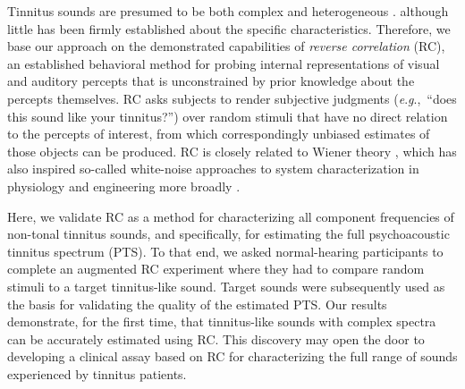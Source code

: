 \documentclass[journal]{IEEEtran}
\newcommand{\eg}{\textit{e}.\textit{g}.,\ }
\begin{document}
Tinnitus sounds are presumed to be both complex and heterogeneous
\cite{vajsakovicPrinciplesMethodsPsychoacoustic2021,henryTinnitusEpidemiologicPerspective2020,meikleTinnitusArchiveArchive2004}.
although little has been firmly established about the specific characteristics.
Therefore, we base our approach on the demonstrated capabilities of \textit{reverse correlation} (RC),
an established behavioral method
\cite{ahumadaStimulusFeaturesSignal1971,gosselinSuperstitiousPerceptionsReveal2003,brimijoinInternalRepresentationVowel2013}
for probing internal representations of visual and auditory percepts that is unconstrained by prior knowledge about the percepts themselves.
RC asks subjects to render subjective judgments (\eg “does this sound like your tinnitus?”)
over random stimuli that have no direct relation to the percepts of interest,
from which correspondingly unbiased estimates of those objects can be produced.
RC is closely related to Wiener theory \cite{wienerNonlinearProblemsRandom1966},
which has also inspired so-called white-noise approaches to system characterization in physiology
\cite{ringachReverseCorrelationNeurophysiology2004,marmarelisWhiteNoiseMethodSystem1978} and engineering more broadly
\cite{ljungMeasureLackFit1978}.

Here, we validate RC as a method for characterizing all component
frequencies of non-tonal tinnitus sounds, and
specifically, for estimating the full psychoacoustic tinnitus spectrum (PTS).
To that end, we asked normal-hearing participants to complete an augmented RC experiment where they had to compare random stimuli to a target tinnitus-like sound.
Target sounds were subsequently used as the basis for validating the quality of the estimated PTS.
Our results demonstrate, for the first time, that tinnitus-like sounds with complex spectra can be accurately estimated using RC. 
This discovery may open the door to developing a clinical assay based on RC for characterizing the full range of sounds experienced by tinnitus patients.

\end{document}
